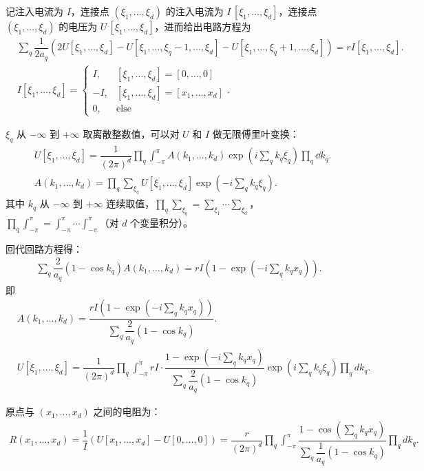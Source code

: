 记注入电流为 \(I\)，连接点 \((\xi_1, \ldots, \xi_d)\) 的注入电流为 \(I\,[\xi_1, \ldots, \xi_d]\)，连接点 \((\xi_1, \ldots, \xi_d)\) 的电压为 \(U\,[\xi_1, \ldots, \xi_d]\)，进而给出电路方程为
\begin{align*}
	&\sum_q \dfrac{1}{2a_q} \left( 2U[\xi_1, \ldots, \xi_d] - U[\xi_1, \ldots, \xi_q - 1, \ldots, \xi_d] - U[\xi_1, \ldots, \xi_q + 1, \ldots, \xi_d] \right) = rI[\xi_1, \ldots, \xi_d].\\
	&I[\xi_1, \ldots, \xi_d] =
	\begin{cases}
		I,  & [\xi_1, \ldots, \xi_d] = [0, \ldots, 0]     \\
		-I, & [\xi_1, \ldots, \xi_d] = [x_1, \ldots, x_d] \\
		0,  & \text{else}
	\end{cases}.
\end{align*}

\(\xi_q\) 从 \(-\infty\) 到 \(+\infty\) 取离散整数值，可以对 \(U\) 和 \(I\) 做无限傅里叶变换：
\begin{align*}
	&U[\xi_1, \ldots, \xi_d] = \dfrac{1}{(2\pi)^d} \prod_q \int_{-\pi}^{\pi} A(k_1, \ldots, k_d) \exp\left( i \sum_q k_q \xi_q \right) \prod_q \dd k_q.\\
	&A(k_1, \ldots, k_d) = \prod_q \sum_{\xi_q} U[\xi_1, \ldots, \xi_d] \exp\left( -i \sum_q k_q \xi_q \right).
\end{align*}
其中 \(k_q\) 从 \(-\infty\) 到 \(+\infty\) 连续取值，\(\prod_q \sum_{\xi_q} = \sum_{\xi_1} \cdots \sum_{\xi_d}\)，\(\prod_q \int_{-\pi}^{\pi} = \int_{-\pi}^{\pi} \cdots \int_{-\pi}^{\pi}\)（对 \(d\) 个变量积分）。

回代回路方程得：
\begin{align*}
	\sum_q \dfrac{2}{a_q} (1 - \cos k_q) A(k_1, \ldots, k_d) = rI \left( 1 - \exp\left( -i \sum_q k_q x_q \right) \right).
\end{align*}
即
\begin{align*}
	&A(k_1, \ldots, k_d) = \dfrac{rI \left( 1 - \exp\left( -i \sum_q k_q x_q \right) \right)}{\sum_q \dfrac{2}{a_q} (1 - \cos k_q)}.\\
	&U[\xi_1, \ldots, \xi_d] = \dfrac{1}{(2\pi)^d} \prod_q\int_{-\pi}^{\pi} rI \cdot \dfrac{1 - \exp\left( -i \sum_q k_q x_q \right)}{\sum_q \dfrac{2}{a_q} (1 - \cos k_q)} \exp\left( i \sum_q k_q \xi_q \right) \prod_q dk_q.
\end{align*}

原点与 \((x_1, \ldots, x_d)\) 之间的电阻为：
\begin{align*}
	R(x_1, \ldots, x_d) = \dfrac{1}{I} \left( U[x_1, \ldots, x_d] - U[0, \ldots, 0] \right) = \dfrac{r}{(2\pi)^d} \prod_q \int_{-\pi}^{\pi} \dfrac{1 - \cos\left( \sum_q k_q x_q \right)}{\sum_q \dfrac{1}{a_q} (1 - \cos k_q)} \prod_q dk_q.
\end{align*}

